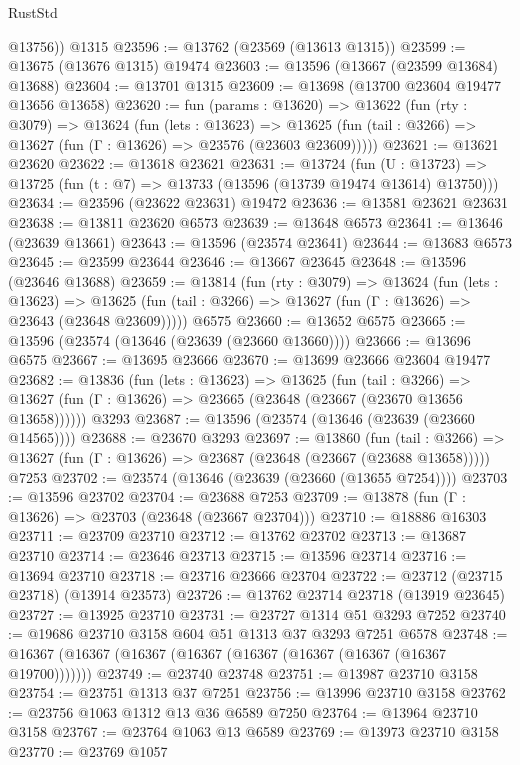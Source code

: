 \begin{lexlean}{RustStd}
\begin{coremodule}
        @13756))
    @1315
@23596 := @13762 (@23569 (@13613 @1315))
@23599 := @13675 (@13676 @1315) @19474
@23603 := @13596 (@13667 (@23599 @13684) @13688)
@23604 := @13701 @1315
@23609 := @13698 (@13700 @23604 @19477 @13656 @13658)
@23620 := fun (params : @13620) =>
  @13622
    (fun (rty : @3079) =>
    @13624
      (fun (lets : @13623) =>
      @13625 (fun (tail : @3266) => @13627 (fun (Γ : @13626) => @23576 (@23603 @23609)))))
@23621 := @13621 @23620
@23622 := @13618 @23621
@23631 := @13724
    (fun (U : @13723) => @13725 (fun (t : @7) => @13733 (@13596 (@13739 @19474 @13614) @13750)))
@23634 := @23596 (@23622 @23631) @19472
@23636 := @13581 @23621 @23631
@23638 := @13811 @23620 @6573
@23639 := @13648 @6573
@23641 := @13646 (@23639 @13661)
@23643 := @13596 (@23574 @23641)
@23644 := @13683 @6573
@23645 := @23599 @23644
@23646 := @13667 @23645
@23648 := @13596 (@23646 @13688)
@23659 := @13814
    (fun (rty : @3079) =>
    @13624
      (fun (lets : @13623) =>
      @13625 (fun (tail : @3266) => @13627 (fun (Γ : @13626) => @23643 (@23648 @23609)))))
    @6575
@23660 := @13652 @6575
@23665 := @13596 (@23574 (@13646 (@23639 (@23660 @13660))))
@23666 := @13696 @6575
@23667 := @13695 @23666
@23670 := @13699 @23666 @23604 @19477
@23682 := @13836
    (fun (lets : @13623) =>
    @13625
      (fun (tail : @3266) =>
      @13627 (fun (Γ : @13626) => @23665 (@23648 (@23667 (@23670 @13656 @13658))))))
    @3293
@23687 := @13596 (@23574 (@13646 (@23639 (@23660 @14565))))
@23688 := @23670 @3293
@23697 := @13860
    (fun (tail : @3266) => @13627 (fun (Γ : @13626) => @23687 (@23648 (@23667 (@23688 @13658)))))
    @7253
@23702 := @23574 (@13646 (@23639 (@23660 (@13655 @7254))))
@23703 := @13596 @23702
@23704 := @23688 @7253
@23709 := @13878 (fun (Γ : @13626) => @23703 (@23648 (@23667 @23704)))
@23710 := @18886 @16303
@23711 := @23709 @23710
@23712 := @13762 @23702
@23713 := @13687 @23710
@23714 := @23646 @23713
@23715 := @13596 @23714
@23716 := @13694 @23710
@23718 := @23716 @23666 @23704
@23722 := @23712 (@23715 @23718) (@13914 @23573)
@23726 := @13762 @23714 @23718 (@13919 @23645)
@23727 := @13925 @23710
@23731 := @23727 @1314 @51 @3293 @7252
@23740 := @19686 @23710 @3158 @604 @51 @1313 @37 @3293 @7251 @6578
@23748 := @16367 (@16367 (@16367 (@16367 (@16367 (@16367 (@16367 (@16367 @19700)))))))
@23749 := @23740 @23748
@23751 := @13987 @23710 @3158
@23754 := @23751 @1313 @37 @7251
@23756 := @13996 @23710 @3158
@23762 := @23756 @1063 @1312 @13 @36 @6589 @7250
@23764 := @13964 @23710 @3158
@23767 := @23764 @1063 @13 @6589
@23769 := @13973 @23710 @3158
@23770 := @23769 @1057

\end{coremodule}
\end{lexlean}
